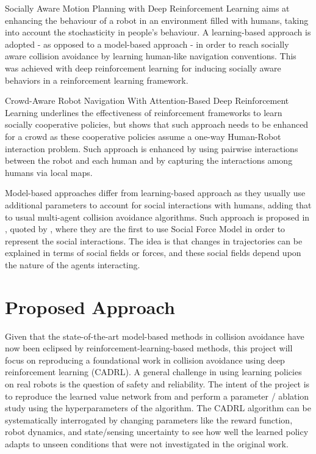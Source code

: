 \documentclass[conference]{IEEEtran}
\begin{document}
Socially Aware Motion Planning with Deep Reinforcement Learning \cite{SocialCA} aims at enhancing the behaviour of a robot in an environment filled with humans, taking into account the stochasticity in people's behaviour. A learning-based approach is adopted - as opposed to a model-based approach - in order to reach socially aware collision avoidance by learning human-like navigation conventions. This was achieved with deep reinforcement learning for inducing socially aware behaviors in a reinforcement learning framework.

Crowd-Aware Robot Navigation With Attention-Based Deep Reinforcement Learning \cite{Crowd} underlines the effectiveness of reinforcement frameworks\cite{SocialCA} to learn socially cooperative policies, but shows that such approach needs to be enhanced for a crowd as these cooperative policies assume a one-way Human-Robot interaction problem. Such approach is enhanced by using pairwise interactions between the robot and each human and by capturing the interactions among humans via local maps. 

Model-based approaches differ from learning-based approach as they usually use additional parameters to account for social interactions with humans, adding that to usual multi-agent collision avoidance algorithms. Such approach is proposed in \cite{Ferrer}, quoted by \cite{SocialCA}, where they are the first to use Social Force Model in order to represent the social interactions. The idea is that changes in trajectories can be explained in terms of social fields or forces, and these social fields depend upon the nature of the agents interacting.

\section{Proposed Approach}
Given that the state-of-the-art model-based methods in collision avoidance have now been eclipsed by reinforcement-learning-based methods, this project will focus on reproducing a foundational work in collision avoidance using deep reinforcement learning (CADRL). A general challenge in using learning policies on real robots is the question of safety and reliability. The intent of the project is to reproduce the learned value network from \cite{chen2017cadrl} and perform a parameter / ablation study using the hyperparameters of the algorithm. The CADRL algorithm can be systematically interrogated by changing parameters like the reward function, robot dynamics, and state/sensing uncertainty to see how well the learned policy adapts to unseen conditions that were not investigated in the original work.
\end{document}
